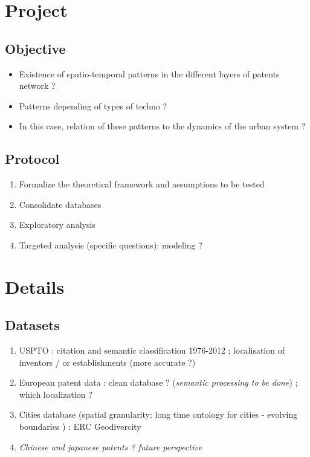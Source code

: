 \section{Project}

\subsection{Objective}

\begin{itemize}
	\item Existence of spatio-temporal patterns in the different layers of patents network ?
	\item Patterns depending of types of techno ?
	\item In this case, relation of these patterns to the dynamics of the urban system ?
\end{itemize}



\subsection{Protocol}


\begin{enumerate}
	\item Formalize the theoretical framework and assumptions to be tested
	\item Consolidate databases
	\item Exploratory analysis
	\item Targeted analysis (specific questions): modeling ?
\end{enumerate}



\section{Details}


\subsection{Datasets}

\begin{enumerate}
	\item USPTO : citation and semantic classification 1976-2012 \cite{bergeaud2017classifying} ; localisation of inventors / or establishments (more accurate ?) \cite{li2014disambiguation}
	\item European patent data : clean database ? (\textit{semantic processing to be done}) ; which localization ?
	\item Cities database (spatial granularity: long time ontology for cities - evolving boundaries \cite{bretagnolle2009villes}) : ERC Geodivercity
	\item \textit{Chinese and japanese patents ? future perspective}
\end{enumerate}


